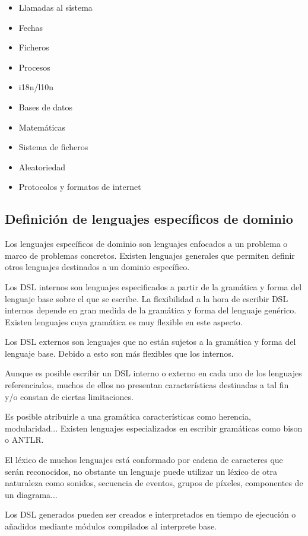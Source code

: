 \begin{itemize}
   \item Llamadas al sistema
   \item Fechas
   \item Ficheros
   \item Procesos
   \item i18n/l10n
   \item Bases de datos 
   \item Matemáticas 
   \item Sistema de ficheros 
   \item Aleatoriedad 
   \item Protocolos y formatos de internet 
\end{itemize}

\subsection{Definición de lenguajes específicos de dominio}
Los lenguajes específicos de dominio son lenguajes enfocados a un problema
o marco de problemas concretos. Existen lenguajes generales que permiten definir 
otros lenguajes destinados a un dominio específico. 

Los DSL internos son lenguajes especificados a partir de la gramática y forma del
lenguaje base sobre el que se escribe. La flexibilidad a la hora de escribir DSL internos depende en 
gran medida de la gramática y forma del lenguaje genérico. Existen lenguajes cuya 
gramática es muy flexible en este aspecto.

Los DSL externos son lenguajes que no están sujetos a la gramática y forma del 
lenguaje base. Debido a esto son más flexibles que los internos.

Aunque es posible escribir un DSL interno o externo en cada uno de los lenguajes referenciados,
muchos de ellos no presentan características destinadas a tal fin y/o constan de ciertas limitaciones.

Es posible atribuirle a una gramática características como herencia, modularidad... Existen lenguajes 
especializados en escribir gramáticas como bison o ANTLR.

El léxico de muchos lenguajes está conformado por cadena de caracteres que serán reconocidos,
no obstante un lenguaje puede utilizar un léxico de otra naturaleza como sonidos,
secuencia de eventos, grupos de píxeles, componentes de un diagrama...

Los DSL generados pueden ser creados e interpretados en tiempo de ejecución o añadidos
mediante módulos compilados al interprete base.

